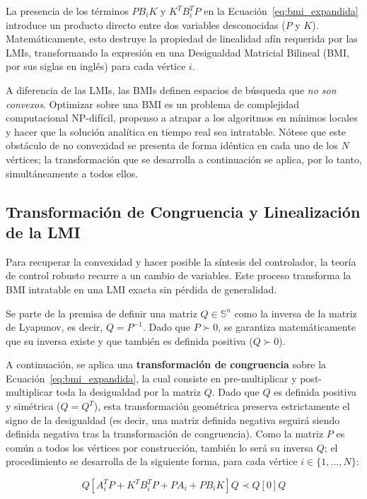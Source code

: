 La presencia de los términos $P B_iK$ y $K^T B_i^T P$ en la Ecuación~\eqref{eq:bmi_expandida} introduce un producto directo entre dos variables desconocidas ($P$ y $K$). Matemáticamente, esto destruye la propiedad de linealidad afín requerida por las LMIs, transformando la expresión en una Desigualdad Matricial Bilineal (BMI, por sus siglas en inglés) para cada vértice $i$.

A diferencia de las LMIs, las BMIs definen espacios de búsqueda que \textit{no son convexos}. Optimizar sobre una BMI es un problema de complejidad computacional NP-difícil, propenso a atrapar a los algoritmos en mínimos locales y hacer que la solución analítica en tiempo real sea intratable. Nótese que este obstáculo de no convexidad se presenta de forma idéntica en cada uno de los $N$ vértices; la transformación que se desarrolla a continuación se aplica, por lo tanto, simultáneamente a todos ellos.

\subsection{Transformación de Congruencia y Linealización de la LMI}

Para recuperar la convexidad y hacer posible la síntesis del controlador, la teoría de control robusto recurre a un cambio de variables. Este proceso transforma la BMI intratable en una LMI exacta sin pérdida de generalidad.

Se parte de la premisa de definir una matriz $Q \in \mathbb{S}^n$ como la inversa de la matriz de Lyapunov, es decir, $Q = P^{-1}$. Dado que $P \succ 0$, se garantiza matemáticamente que su inversa existe y que también es definida positiva ($Q \succ 0$).

A continuación, se aplica una \textbf{transformación de congruencia} sobre la Ecuación~\eqref{eq:bmi_expandida}, la cual consiste en pre-multiplicar y post-multiplicar toda la desigualdad por la matriz $Q$. Dado que $Q$ es definida positiva y simétrica ($Q = Q^T$), esta transformación geométrica preserva estrictamente el signo de la desigualdad (es decir, una matriz definida negativa seguirá siendo definida negativa tras la transformación de congruencia). Como la matriz $P$ es común a todos los vértices por construcción, también lo será su inversa $Q$; el procedimiento se desarrolla de la siguiente forma, para cada vértice $i \in \{1,\dots,N\}$:

\begin{equation}
    Q \left[ A_i^T P + K^T B_i^T P + P A_i + P B_iK \right] Q \prec Q [0] Q
    \label{eq:congruencia_paso1}
\end{equation}

